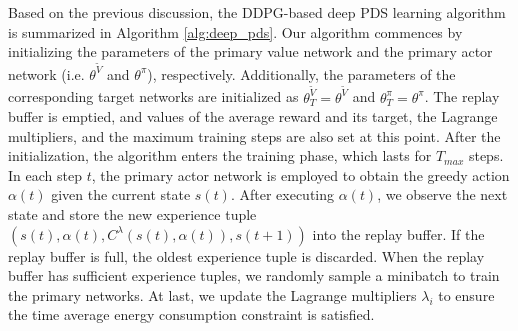 \documentclass[lettersize, journal]{IEEEtran}
\begin{document}
Based on the previous discussion, the DDPG-based deep PDS learning algorithm is summarized in Algorithm \ref{alg:deep_pds}.
Our algorithm commences by initializing the parameters of the primary value network and the primary actor network (i.e. $\theta^{\tilde{V}}$ and $\theta^{\pi}$), respectively. 
Additionally, the parameters of the corresponding target networks are initialized as $\theta^{\tilde{V}}_T = \theta^{\tilde{V}}$ and $\theta^{\pi}_T = \theta^{\pi}$. 
The replay buffer is emptied, and values of the average reward and its target, the Lagrange multipliers, and the maximum training steps are also set at this point.
After the initialization, the algorithm enters the training phase, which lasts for $T_{max}$ steps. 
In each step $t$, the primary actor network is employed to obtain the greedy action $\alpha(t)$ given the current state $s(t)$. 
After executing $\alpha(t)$, we observe the next state and store the new experience tuple $(s(t), \alpha(t), C^{\lambda}(s(t), \alpha(t)), s(t+1))$ into the replay buffer.
If the replay buffer is full, the oldest experience tuple is discarded.
When the replay buffer has sufficient experience tuples, we randomly sample a minibatch to train the primary networks.
At last, we update the Lagrange multipliers $\lambda_i$ to ensure the time average energy consumption constraint is satisfied.
\end{document}
